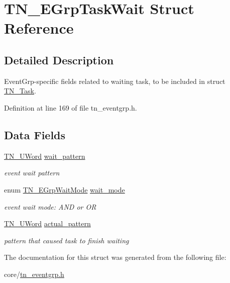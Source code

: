 \hypertarget{structTN__EGrpTaskWait}{\section{T\+N\+\_\+\+E\+Grp\+Task\+Wait Struct Reference}
\label{structTN__EGrpTaskWait}
}


\subsection{Detailed Description}
Event\+Grp-\/specific fields related to waiting task, to be included in struct \hyperlink{structTN__Task}{T\+N\+\_\+\+Task}. 

Definition at line 169 of file tn\+\_\+eventgrp.\+h.

\subsection*{Data Fields}
\begin{DoxyCompactItemize}
\item 
\hypertarget{structTN__EGrpTaskWait_a9e35b117bbf6c8ed435bf08b7ca875b3}{\hyperlink{tn__arch__example_8h_ab80cba0fe9ffcd9011d53dfeb9e39bf4}{T\+N\+\_\+\+U\+Word} \hyperlink{structTN__EGrpTaskWait_a9e35b117bbf6c8ed435bf08b7ca875b3}{wait\+\_\+pattern}}\label{structTN__EGrpTaskWait_a9e35b117bbf6c8ed435bf08b7ca875b3}

\begin{DoxyCompactList}\small\item\em event wait pattern \end{DoxyCompactList}\item 
\hypertarget{structTN__EGrpTaskWait_a0f62cf02ae71ab6a79b01f28f48854f8}{enum \hyperlink{tn__eventgrp_8h_a9d42ee61ae8da342f1cd6440b7e54bbd}{T\+N\+\_\+\+E\+Grp\+Wait\+Mode} \hyperlink{structTN__EGrpTaskWait_a0f62cf02ae71ab6a79b01f28f48854f8}{wait\+\_\+mode}}\label{structTN__EGrpTaskWait_a0f62cf02ae71ab6a79b01f28f48854f8}

\begin{DoxyCompactList}\small\item\em event wait mode\+: {\ttfamily A\+N\+D} or {\ttfamily O\+R} \end{DoxyCompactList}\item 
\hypertarget{structTN__EGrpTaskWait_ab0dd157cd06693b45a73a4b82ad713e8}{\hyperlink{tn__arch__example_8h_ab80cba0fe9ffcd9011d53dfeb9e39bf4}{T\+N\+\_\+\+U\+Word} \hyperlink{structTN__EGrpTaskWait_ab0dd157cd06693b45a73a4b82ad713e8}{actual\+\_\+pattern}}\label{structTN__EGrpTaskWait_ab0dd157cd06693b45a73a4b82ad713e8}

\begin{DoxyCompactList}\small\item\em pattern that caused task to finish waiting \end{DoxyCompactList}\end{DoxyCompactItemize}


The documentation for this struct was generated from the following file\+:\begin{DoxyCompactItemize}
\item 
core/\hyperlink{tn__eventgrp_8h}{tn\+\_\+eventgrp.\+h}\end{DoxyCompactItemize}
